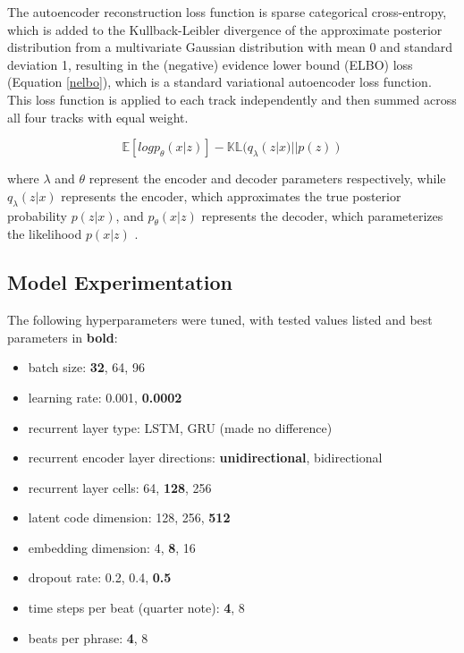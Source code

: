 \documentclass[sigconf,authorversion]{acmart}
\providecommand{\tightlist}{%
  \setlength{\itemsep}{0pt}\setlength{\parskip}{0pt}}
\begin{document}
The autoencoder reconstruction loss function is sparse categorical
cross-entropy, which is added to the Kullback-Leibler divergence of
the approximate posterior distribution from a multivariate Gaussian
distribution with mean 0 and standard deviation 1, resulting in the
(negative) evidence lower bound (ELBO) loss (Equation \ref{nelbo}),
which is a standard variational autoencoder loss function. This loss
function is applied to each track independently and then summed across
all four tracks with equal weight.

\begin{equation}
  \label{nelbo}
\mathbb{E}[log{p_\theta}(x|z)]-\mathbb{KL}(q_\lambda(z|x)||p(z))
\end{equation}

where $\lambda$ and $\theta$ represent the encoder and decoder
parameters respectively, while $q_\lambda(z|x)$ represents the
encoder, which approximates the true posterior probability $p(z|x)$,
and $p_\theta(x|z)$ represents the decoder, which parameterizes the
likelihood $p(x|z)$ \cite{roberts_hierarchical_2018}.



\subsection{Model Experimentation}

The following hyperparameters were tuned, with tested values listed
and best parameters in \textbf{bold}:

\begin{itemize}
  \tightlist
  \item batch size: \textbf{32}, 64, 96
  \item learning rate: 0.001, \textbf{0.0002}
  \item recurrent layer type: LSTM, GRU (made no difference)
  \item recurrent encoder layer directions: \textbf{unidirectional}, bidirectional
  \item recurrent layer cells: 64, \textbf{128}, 256
  \item latent code dimension: 128, 256, \textbf{512}
  \item embedding dimension: 4, \textbf{8}, 16
  \item dropout rate: 0.2, 0.4, \textbf{0.5}
  \item time steps per beat (quarter note): \textbf{4}, 8
  \item beats per phrase: \textbf{4}, 8
\end{itemize}
\end{document}
